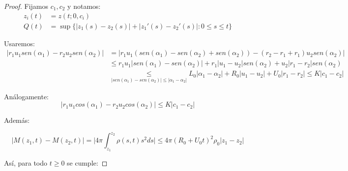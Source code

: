 \documentclass[a4paper,10pt]{scrartcl}
\theoremstyle{definition}
\numberwithin{equation}{section}
\begin{document}
\begin{proof}
 Fijamos $c_1, c_2$ y notamos:
 \begin{align*}
    z_i(t) &= z(t; 0, c_i)\\
    Q(t) &= \sup\{|z_1(s) - z_2(s)| + |z_1'(s) - z_2'(s)|: 0 \le s \le t\}
 \end{align*}
 
 
 Usaremos:
 \begin{align}
 |r_1 u_1 sen(\alpha_1) - r_2 u_2 sen(\alpha_2)| &= |r_1 u_1 (sen(\alpha_1) - sen(\alpha_2) + sen(\alpha_2)) - (r_2 - r_1 + r_1) u_2 sen(\alpha_2)| \nonumber \\
 &\le r_1 u_1 |sen(\alpha_1) - sen(\alpha_2)| + r_1|u_1 - u_2| sen(\alpha_2) + u_2|r_1 - r_2| sen(\alpha_2) \nonumber\\
 &\underset{|sen(\alpha_1) - sen(\alpha_2)| \le |\alpha_1 - \alpha_2|}{\le} L_0|\alpha_1 - \alpha_2| + R_0|u_1 - u_2| + U_0|r_1 - r_2| \le K|c_1 - c_2|
 \label{ineq:sins}
 \end{align}
 
 Análogamente:
 \[
  |r_1 u_1 cos(\alpha_1) - r_2 u_2 cos(\alpha_2)| \le K|c_1 - c_2|
 \]
 
 Además:
 
\[
 |M(z_1, t) - M(z_2, t)| = \bigg|4\pi \int_{z_1}^{z_2} \rho(s,t) s^2 ds \bigg| \le 4\pi(R_0 + U_0t)^2 \rho_0 |z_1 - z_2|
\]

 
 
 Así, para todo $t\ge 0$ se cumple:
 

\end{proof}
\end{document}
